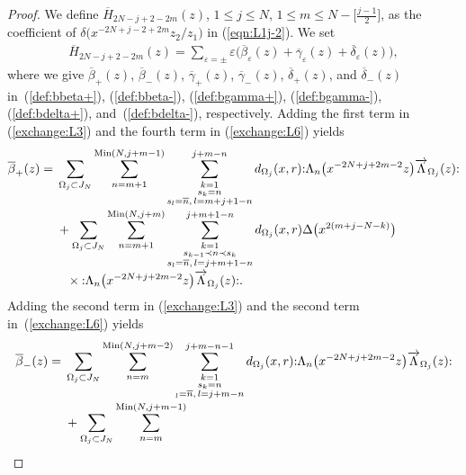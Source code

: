 \documentclass[10pt,a4paper]{amsart}
\numberwithin{equation}{section}
\begin{document}
\begin{proof}
{\sloppy We define $\overline{H}_{2N-j+2-2m}(z)$,
$1\leq j \leq N$, $1\leq m \leq N-\big[\frac{j-1}{2}\big]$,
as the coefficient of $\delta\big(x^{-2N+j-2+2m}z_2/z_1\big)$ in (\ref{eqn:L1j-2}).
We set
\begin{gather*}
\overline{H}_{2N-j+2-2m}(z)=\sum_{\varepsilon=\pm}\varepsilon
\big(\overline{\beta}_\varepsilon(z)+\overline{\gamma}_\varepsilon(z)
+\overline{\delta}_\varepsilon(z)\big),
\end{gather*}}%
where we give
$\overline{\beta}_+(z)$, $\overline{\beta}_-(z)$, $\overline{\gamma}_+(z)$,
$\overline{\gamma}_-(z)$, $\overline{\delta}_+(z)$, and $\overline{\delta}_-(z)$
in~(\ref{def:bbeta+}), (\ref{def:bbeta-}), (\ref{def:bgamma+}), (\ref{def:bgamma-}),
(\ref{def:bdelta+}), and~(\ref{def:bdelta-}), respectively.
Adding the first term in (\ref{exchange:L3}) and the fourth term
in (\ref{exchange:L6}) yields
\begin{align}
\overline{\beta}_+(z)={}&\sum_{\Omega_j \subset J_N}
\sum_{n=m+1}^{\operatorname{Min}(N, j+m-1)}
\sum\limits_{\substack{k=1\\s_k=n
\\ s_l=\overline{n},\, l=m+j+1-n}}^{j+m-n}d_{\Omega_j}(x,r)
{:}\Lambda_{n}\big(x^{-2N+j+2m-2}z\big)\overrightarrow{\Lambda}_{\Omega_j}(z){:}\notag
\\[-.5ex]
&+\sum_{\Omega_j \subset J_N}\sum_{n=m+1}^{\operatorname{Min}(N, j+m)}
\sum\limits_{\substack{k=1\\s_{k-1}\prec n \prec s_k
\\ s_l=\overline{n},\, l=j+m+1-n}}^{j+m+1-n}
d_{\Omega_j}(x,r)\Delta\big(x^{2(m+j-N-k)}\big)\notag
\\[-.5ex]
&\phantom{+}\times{:}\Lambda_{n}\big(x^{-2N+j+2m-2}z\big)\overrightarrow{\Lambda}_{\Omega_j}(z){:}.
\label{def:bbeta+}
\end{align}
Adding the second term in (\ref{exchange:L3}) and the second term in~(\ref{exchange:L6}) yields
\begin{align}
\overline{\beta}_-(z)={}&
\sum_{\Omega_j \subset J_N}\sum_{n=m}^{\operatorname{Min}(N, j+m-2)}
\sum\limits_{\substack{k=1\\s_k=n
\\{_l=\overline{n},\, l=j+m-n}}}^{j+m-n-1}
d_{\Omega_j}(x,r)
{:}\Lambda_{n}\big(x^{-2N+j+2m-2}z\big)\overrightarrow{\Lambda}_{\Omega_j}(z){:}\notag
\\[-.5ex]
&+\sum_{\Omega_j \subset J_N}\sum_{n=m}^{\operatorname{Min}(N, j+m-1)}

\end{align}
\end{proof}
\end{document}
